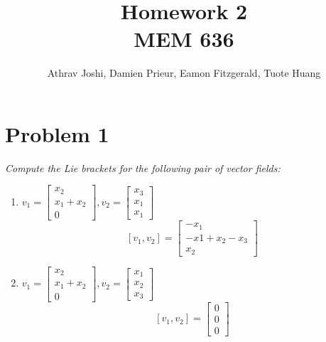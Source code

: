 \documentclass{article}
\title{Homework 2 \\ MEM 636}
\author{Athrav Joshi, Damien Prieur, Eamon Fitzgerald, Tuote Huang}
\date{}
\begin{document}
\maketitle

\section*{Problem 1}
\emph{Compute the Lie brackets for the following pair of vector fields:}
\begin{enumerate}[(1)]
\item $v_1 = \begin{bmatrix} x_2 \\ x_1 + x_2 \\ 0 \end{bmatrix}, v_2 = \begin{bmatrix} x_3 \\ x_1 \\ x_1 \end{bmatrix}$
$$ [v_1,v_2] =
\begin{bmatrix}
-x_1 \\
-x1+x_2-x_3 \\
x_2
\end{bmatrix}
$$
\item $v_1 = \begin{bmatrix} x_2 \\ x_1 + x_2 \\ 0 \end{bmatrix}, v_2 = \begin{bmatrix} x_1 \\ x_2 \\ x_3 \end{bmatrix}$
$$ [v_1,v_2] =
\begin{bmatrix}
0 \\
0 \\
0
\end{bmatrix}
$$
\end{enumerate}

\newpage
\end{document}
